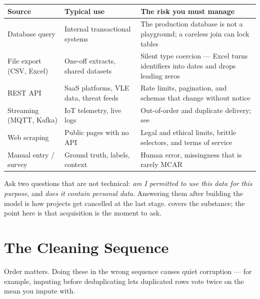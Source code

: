 \begin{longtable}{@{}L{2.9cm}L{5.0cm}L{6.7cm}@{}}
\toprule
{}
\textbf{Source} & \textbf{Typical use} & \textbf{The risk you must manage} \\
\midrule
\endhead
Database query & Internal transactional systems & The production database is not a playground; a careless join can lock tables \\
File export (CSV, Excel) & One-off extracts, shared datasets & Silent type coercion --- Excel turns identifiers into dates and drops leading zeros \\
REST API & SaaS platforms, VLE data, threat feeds & Rate limits, pagination, and schemas that change without notice \\
Streaming (MQTT, Kafka) & IoT telemetry, live logs & Out-of-order and duplicate delivery; see  \\
Web scraping & Public pages with no API & Legal and ethical limits, brittle selectors, and terms of service \\
Manual entry / survey & Ground truth, labels, context & Human error, missingness that is rarely MCAR \\
\bottomrule
\end{longtable}

\begin{alertbox}
Ask two questions that are not technical: \emph{am I permitted to use this data
for this purpose}, and \emph{does it contain personal data}. Answering them after
building the model is how projects get cancelled at the last stage.
 covers the substance; the point here is that acquisition is the
moment to ask.
\end{alertbox}

\section{The Cleaning Sequence}

Order matters. Doing these in the wrong sequence causes quiet corruption --- for
example, imputing before deduplicating lets duplicated rows vote twice on the
mean you impute with.

